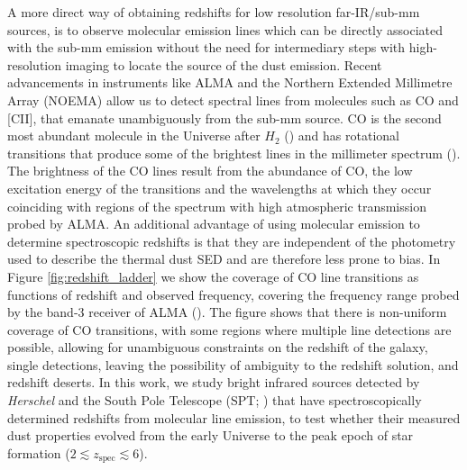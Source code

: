 A more direct way of obtaining redshifts for low resolution far-IR/sub-mm sources, is to observe molecular emission lines which can be directly associated with the sub-mm emission without the need for intermediary steps with high-resolution imaging to locate the source of the dust emission. Recent advancements in instruments like ALMA and the Northern Extended Millimetre Array (NOEMA) allow us to detect spectral lines from molecules such as CO and [CII], that emanate unambiguously from the sub-mm source. CO is the second most abundant molecule in the Universe after $H_2$ (\citealt{Glover_2011}) and has rotational transitions that produce some of the brightest lines in the millimeter spectrum (\citealt{Rickard_1975}). The brightness of the CO lines result from the abundance of CO, the low excitation energy of the transitions and the wavelengths at which they occur coinciding with regions of the spectrum with high atmospheric transmission probed by ALMA. An additional advantage of using molecular emission to determine spectroscopic redshifts is that they are independent of the photometry used to describe the thermal dust SED and are therefore less prone to bias. In Figure \ref{fig:redshift_ladder} we show the coverage of CO line transitions as functions of redshift and observed frequency, covering the frequency range probed by the band-3 receiver of ALMA (\citealt{Weiss_2013}). The figure shows that there is non-uniform coverage of CO transitions, with some regions where multiple line detections are possible, allowing for unambiguous constraints on the redshift of the galaxy, single detections, leaving the possibility of ambiguity to the redshift solution, and redshift deserts. In this work, we study bright infrared sources detected by \textit{Herschel} and the South Pole Telescope (SPT; \citealt{Carlstrom_2011}) that have spectroscopically determined redshifts from molecular line emission, to test whether their measured dust properties evolved from the early Universe to the peak epoch of star formation ($2 \lesssim z_{\textrm{spec}} \lesssim 6$). 

